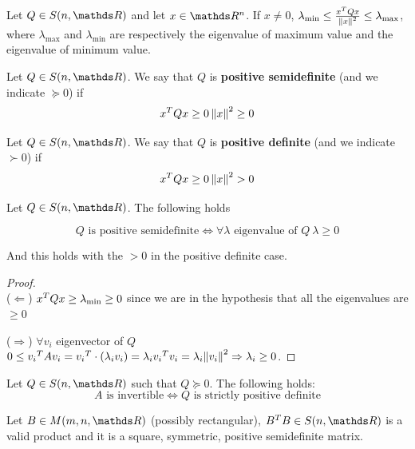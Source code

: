 \documentclass[computationalMathematics.tex]{subfiles}
\begin{document}
\begin{corollary}
  Let $Q \in S(n, \R)$ and let $x \in \R^n$. If $x \neq 0$, $\lambda_{\text{min}} \le \frac{{x}^{T}Qx}{{\left\lVert x\right\rVert}^2} \le \lambda_{\text{max}}$, where $\lambda_{\text{max}}$ and $\lambda_{\text{min}}$ are respectively the eigenvalue of maximum value and the eigenvalue of minimum value.
\end{corollary}

\begin{definition}
  Let $Q \in S(n, \R)$. We say that $Q$ is \textbf{positive semidefinite} (and we indicate $\succeq 0$) if 
  \[
    {x}^{T} Q x \ge 0\left\lVert x\right\rVert^2 \geq 0
  \]
\end{definition}

\begin{definition}
   Let $Q \in S(n, \R)$. We say that $Q$ is \textbf{positive definite} (and we indicate $\succ 0$) if 
  \[
    {x}^{T} Q x \ge 0\left\lVert x\right\rVert^2 > 0
  \]
\end{definition}

\begin{proposition}
  Let $Q \in S(n, \R)$. The following holds
  
  \[
    Q \text{ is positive semidefinite} \iff \forall \lambda \text{ eigenvalue of } Q ~ \lambda \ge 0
  \]

  And this holds with the $>0$ in the positive definite case.
\end{proposition}

\begin{proof}~\\

  \indent ($\Leftarrow$) ${x}^{T} Q x \ge \lambda_{\text{min}} \geq 0$ since we are in the hypothesis that all the eigenvalues are $\geq 0$

  \indent  ($\Rightarrow$) $ \forall v_i$ eigenvector of $Q$ $0 \le {v_i}^{T} A v_i = {v_i}^{T} \cdot ( \lambda_i v_i) = \lambda_i  {v_i}^{T} v_i = \lambda_i {\left\lVert v_i\right\rVert}^2 \Rightarrow \lambda_i \ge 0$.
\end{proof}

\begin{corollary}
  Let $Q \in S(n, \R)$ such that $Q \succeq 0$. The following holds:
  \[
    A \text{ is invertible} \iff Q \text{ is strictly positive definite}
  \]
\end{corollary}

\begin{proposition}
  Let $B \in M(m, n, \R)$ (possibly rectangular), $\tr{B} B \in S(n, \R)$ is a valid product and it is a square, symmetric, positive semidefinite matrix.
\end{proposition}
\end{document}
